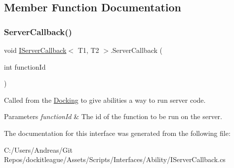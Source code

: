 \subsection{Member Function Documentation}
\hypertarget{interface_i_server_callback_a2fb5354c07d38473e81ba374bad19446}{}\label{interface_i_server_callback_a2fb5354c07d38473e81ba374bad19446} 
\subsubsection{\texorpdfstring{Server\+Callback()}{ServerCallback()}}
{\footnotesize\ttfamily void \hyperlink{interface_i_server_callback}{I\+Server\+Callback}$<$ T1, T2 $>$.Server\+Callback (\begin{DoxyParamCaption}\item[{int}]{function\+Id }\end{DoxyParamCaption})}



Called from the \hyperlink{class_docking}{Docking} to give abilities a way to run server code. 


\begin{DoxyParams}{Parameters}
{\em function\+Id} & The id of the function to be run on the server.\\
\hline
\end{DoxyParams}


The documentation for this interface was generated from the following file\+:\begin{DoxyCompactItemize}
\item 
C\+:/\+Users/\+Andreas/\+Git Repos/dockitleague/\+Assets/\+Scripts/\+Interfaces/\+Ability/I\+Server\+Callback.\+cs\end{DoxyCompactItemize}
